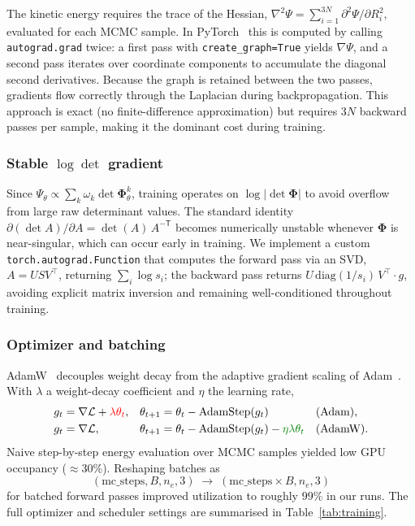 The kinetic energy requires the trace of the Hessian, $\nabla^2\Psi = \sum_{i=1}^{3N}\partial^2\Psi/\partial R_i^2$, evaluated for each MCMC sample. In PyTorch~\cite{pytorch} this is computed by calling \texttt{autograd.grad} twice: a first pass with \texttt{create\_graph=True} yields $\nabla\Psi$, and a second pass iterates over coordinate components to accumulate the diagonal second derivatives. Because the graph is retained between the two passes, gradients flow correctly through the Laplacian during backpropagation. This approach is exact (no finite-difference approximation) but requires $3N$ backward passes per sample, making it the dominant cost during training.

\subsubsection{Stable $\log\det$ gradient}

Since $\Psi_\theta \propto \sum_k \omega_k \det\boldsymbol{\Phi}_\theta^k$, training operates on $\log|\det\boldsymbol{\Phi}|$ to avoid overflow from large raw determinant values. The standard identity $\partial(\det A)/\partial A = \det(A)\,A^{-\mathsf T}$ becomes numerically unstable whenever $\boldsymbol{\Phi}$ is near-singular, which can occur early in training. We implement a custom \texttt{torch.autograd.Function} that computes the forward pass via an SVD, $A = U S V^\top$, returning $\sum_i \log s_i$; the backward pass returns $U \,\mathrm{diag}(1/s_i)\, V^\top \cdot g$, avoiding explicit matrix inversion and remaining well-conditioned throughout training.

\subsubsection{Optimizer and batching}

AdamW~\cite{adamw} decouples weight decay from the adaptive gradient scaling of Adam~\cite{adam}. With $\lambda$ a weight-decay coefficient and $\eta$ the learning rate,
\begin{align*}
	g_t &= \nabla \mathcal{L} + \textcolor{red}{\lambda \theta_t}, &
	\theta_{t+1} &= \theta_t - \mathrm{AdamStep}(g_t) && \text{(Adam)},\\
	g_t &= \nabla \mathcal{L}, &
	\theta_{t+1} &= \theta_t - \mathrm{AdamStep}(g_t) - \textcolor{green!50!black}{\eta\lambda\theta_t} && \text{(AdamW)}.
\end{align*}
Naive step-by-step energy evaluation over MCMC samples yielded low GPU occupancy ($\approx 30\%$). Reshaping batches as
\begin{equation*}
	(\text{mc\_steps}, B, n_e, 3)\;\longrightarrow\;(\text{mc\_steps}\times B, n_e, 3)
\end{equation*}
for batched forward passes improved utilization to roughly $99\%$ in our runs. The full optimizer and scheduler settings are summarised in Table~\ref{tab:training}.

